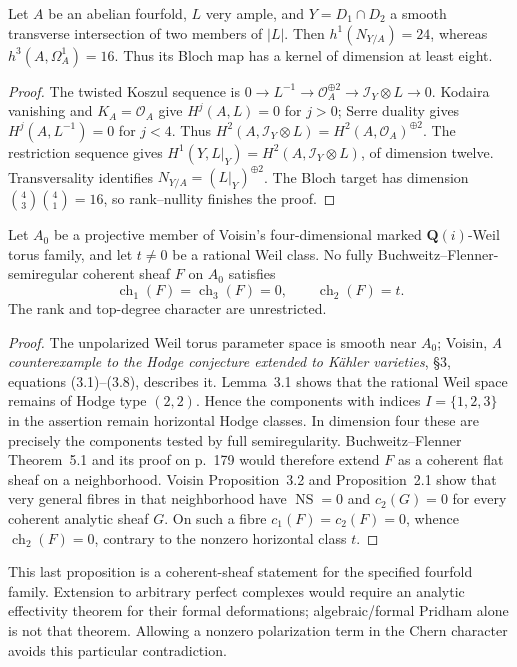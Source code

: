 \begin{proposition}
\label{prop:semireg-ci-counterexample}
Let $A$ be an abelian fourfold, $L$ very ample, and
$Y=D_1\cap D_2$ a smooth transverse intersection of two members
of $|L|$. Then $h^1(N_{Y/A})=24$, whereas
$h^3(A,\Omega_A^1)=16$. Thus its Bloch map has a kernel of
dimension at least eight.
\end{proposition}
\begin{proof}
The twisted Koszul sequence is
$0\to L^{-1}\to\mathcal O_A^{\oplus2}\to\mathcal I_Y\otimes L\to0$.
Kodaira vanishing and $K_A=\mathcal O_A$ give $H^j(A,L)=0$ for
$j>0$; Serre duality gives $H^j(A,L^{-1})=0$ for $j<4$.
Thus
$H^2(A,\mathcal I_Y\otimes L)=H^2(A,\mathcal O_A)^{\oplus2}$.
The restriction sequence gives
$H^1(Y,L|_Y)=H^2(A,\mathcal I_Y\otimes L)$, of dimension twelve.
Transversality identifies $N_{Y/A}=(L|_Y)^{\oplus2}$.
The Bloch target has dimension
$\binom43\binom41=16$, so rank--nullity finishes the proof.
\end{proof}

\begin{proposition}
\label{prop:semireg-pure-weil-no-go}
Let $A_0$ be a projective member of Voisin's four-dimensional
marked $\mathbf Q(i)$-Weil torus family, and let $t\ne0$ be a
rational Weil class. No fully Buchweitz--Flenner-semiregular
coherent sheaf $F$ on $A_0$ satisfies
\[
 \operatorname{ch}_1(F)=\operatorname{ch}_3(F)=0,\qquad
 \operatorname{ch}_2(F)=t.
\]
The rank and top-degree character are unrestricted.
\end{proposition}
\begin{proof}
The unpolarized Weil torus parameter space is smooth near $A_0$;
Voisin, \emph{A counterexample to the Hodge conjecture extended
to K\"ahler varieties}, \S3, equations (3.1)--(3.8), describes it.
Lemma~3.1 shows that the rational Weil space remains of Hodge
type $(2,2)$. Hence the components with indices $I=\{1,2,3\}$
in the assertion remain horizontal Hodge classes. In dimension
four these are precisely the components tested by full
semiregularity.
Buchweitz--Flenner Theorem~5.1 and its proof on p.~179 would
therefore extend $F$ as a coherent flat sheaf on a neighborhood.
Voisin Proposition~3.2 and Proposition~2.1 show that very general
fibres in that neighborhood have $\operatorname{NS}=0$ and
$c_2(G)=0$ for every coherent analytic sheaf $G$.
On such a fibre $c_1(F)=c_2(F)=0$, whence
$\operatorname{ch}_2(F)=0$, contrary to the nonzero horizontal
class $t$.
\end{proof}

This last proposition is a coherent-sheaf statement for the
specified fourfold family. Extension to arbitrary perfect complexes
would require an analytic effectivity theorem for their formal
deformations; algebraic/formal Pridham alone is not that theorem.
Allowing a nonzero polarization term in the Chern character
avoids this particular contradiction.
